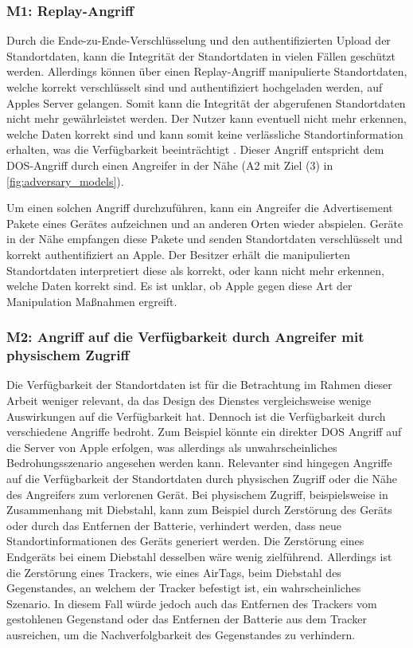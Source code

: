 \subsubsection[Szenario M1]{M1: Replay-Angriff}
\label{missbrauch:1}
Durch die Ende-zu-Ende-Verschlüsselung und den authentifizierten Upload der Standortdaten, kann die Integrität der Standortdaten in vielen Fällen geschützt werden.
Allerdings können über einen Replay-Angriff manipulierte Standortdaten, welche korrekt verschlüsselt sind und authentifiziert hochgeladen werden, auf Apples Server gelangen.
Somit kann die Integrität der abgerufenen Standortdaten nicht mehr gewährleistet werden.
Der Nutzer kann eventuell nicht mehr erkennen, welche Daten korrekt sind und kann somit keine verlässliche Standortinformation erhalten, was die Verfügbarkeit beeinträchtigt \cite{Heinrich_FindMy}.
Dieser Angriff entspricht dem \ac{DOS}-Angriff durch einen Angreifer in der Nähe (A2 mit Ziel (3) in \autoref{fig:adversary_models}).

Um einen solchen Angriff durchzuführen, kann ein Angreifer die Advertisement Pakete eines Gerätes aufzeichnen und an anderen Orten wieder abspielen.
Geräte in der Nähe empfangen diese Pakete und senden Standortdaten verschlüsselt und korrekt authentifiziert an Apple.
Der Besitzer erhält die manipulierten Standortdaten interpretiert diese als korrekt, oder kann nicht mehr erkennen, welche Daten korrekt sind.
Es ist unklar, ob Apple gegen diese Art der Manipulation Maßnahmen ergreift.


\subsubsection[Szenario M2]{M2: Angriff auf die Verfügbarkeit durch Angreifer mit physischem Zugriff}
\label{missbrauch:2}
Die Verfügbarkeit der Standortdaten ist für die Betrachtung im Rahmen dieser Arbeit weniger relevant, da das Design des Dienstes vergleichsweise wenige Auswirkungen auf die Verfügbarkeit hat.
Dennoch ist die Verfügbarkeit durch verschiedene Angriffe bedroht.
Zum Beispiel könnte ein direkter \ac{DOS} Angriff auf die Server von Apple erfolgen, was allerdings als unwahrscheinliches Bedrohungsszenario angesehen werden kann.
Relevanter sind hingegen Angriffe auf die Verfügbarkeit der Standortdaten durch physischen Zugriff oder die Nähe des Angreifers zum verlorenen Gerät.
Bei physischem Zugriff, beispielsweise in Zusammenhang mit Diebstahl, kann zum Beispiel durch Zerstörung des Geräts oder durch das Entfernen der Batterie, verhindert werden, dass neue Standortinformationen des Geräts generiert werden.
Die Zerstörung eines Endgeräts bei einem Diebstahl desselben wäre wenig zielführend.
Allerdings ist die Zerstörung eines Trackers, wie eines AirTags, beim Diebstahl des Gegenstandes, an welchem der Tracker befestigt ist, ein wahrscheinliches Szenario.
In diesem Fall würde jedoch auch das Entfernen des Trackers vom gestohlenen Gegenstand oder das Entfernen der Batterie aus dem Tracker ausreichen, um die Nachverfolgbarkeit des Gegenstandes zu verhindern.

